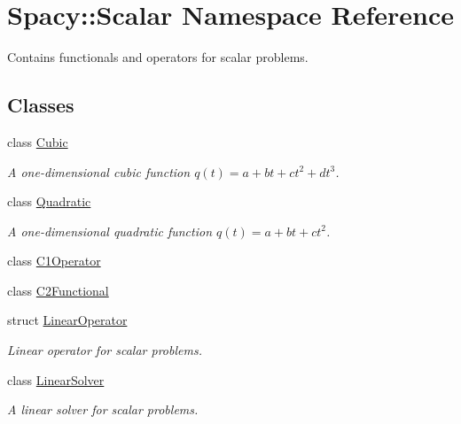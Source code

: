 \hypertarget{namespaceSpacy_1_1Scalar}{\section{Spacy\-:\-:Scalar Namespace Reference}
\label{namespaceSpacy_1_1Scalar}
}


Contains functionals and operators for scalar problems.  


\subsection*{Classes}
\begin{DoxyCompactItemize}
\item 
class \hyperlink{classSpacy_1_1Scalar_1_1Cubic}{Cubic}
\begin{DoxyCompactList}\small\item\em A one-\/dimensional cubic function $q(t) = a + bt + ct^2 + dt^3$. \end{DoxyCompactList}\item 
class \hyperlink{classSpacy_1_1Scalar_1_1Quadratic}{Quadratic}
\begin{DoxyCompactList}\small\item\em A one-\/dimensional quadratic function $q(t) = a + bt + ct^2$. \end{DoxyCompactList}\item 
class \hyperlink{classSpacy_1_1Scalar_1_1C1Operator}{C1\-Operator}
\item 
class \hyperlink{classSpacy_1_1Scalar_1_1C2Functional}{C2\-Functional}
\item 
struct \hyperlink{structSpacy_1_1Scalar_1_1LinearOperator}{Linear\-Operator}
\begin{DoxyCompactList}\small\item\em Linear operator for scalar problems. \end{DoxyCompactList}\item 
class \hyperlink{classSpacy_1_1Scalar_1_1LinearSolver}{Linear\-Solver}
\begin{DoxyCompactList}\small\item\em A linear solver for scalar problems. \end{DoxyCompactList}\end{DoxyCompactItemize}
